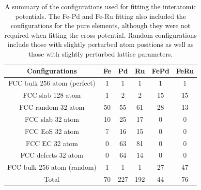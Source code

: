 \begin{table}[h]
\begin{center}
\renewcommand{\arraystretch}{1.2}
\begin{tabular}{c c c c c c}
\hline\hline
Configurations               & \Gls{Fe} & \Gls{Pd} & \Gls{Ru} & \Gls{Fe}\Gls{Pd} & \Gls{Fe}\Gls{Ru} \\
\hline\hline
FCC bulk 256 atom (perfect)  &  1       &  1       &  1       &  1               & 1                \\
FCC slab 128 atom            &  1       &  2       &  2       & 15               & 15               \\
FCC random 32 atom           & 50       & 55       & 61       & 28               & 13               \\ 
FCC slab 32 atom             & 10       & 25       & 17       &  0               & 0                 \\   
FCC EoS 32 atom              &  7       & 16       & 15       &  0               & 0                 \\
FCC EC 32 atom               &  0       & 63       & 81       &  0               & 0                 \\                     
FCC defects 32 atom          &  0       & 64       & 14       &  0               & 0                 \\   
FCC bulk 256 atom (random)   &  1       &  1       &  1       & 27               & 47                \\ \hline\hline   
Total                        & 70       &227       &192       & 44               & 76                \\ 
\hline\hline
\end{tabular}
\end{center}
\caption{A summary of the configurations used for fitting the interatomic potentials.  The Fe-Pd and Fe-Ru fitting also included the configurations for the pure elements, although they were not required when fitting the cross potential.  Random configurations include those with slightly perturbed atom positions as well as those with slightly perturbed lattice parameters.}
\label{table:configurationsused}
\end{table}





















